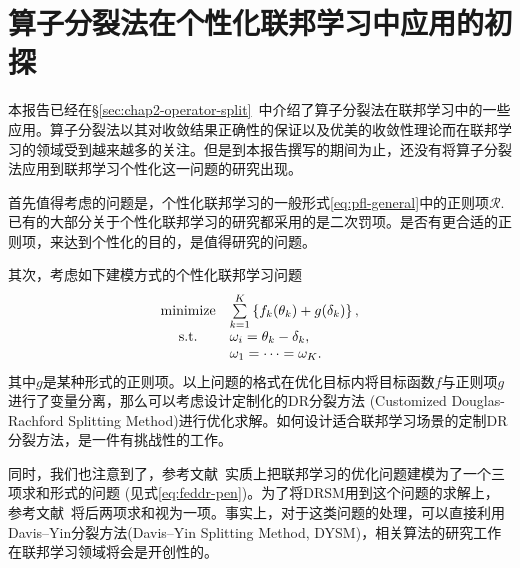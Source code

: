 \section{算子分裂法在个性化联邦学习中应用的初探}
\label{sec:chap3-pfl-os}



本报告已经在\S\ref{sec:chap2-operator-split}~中介绍了算子分裂法在联邦学习中的一些应用。算子分裂法以其对收敛结果正确性的保证\cite{pathak2020fedsplit}以及优美的收敛性理论\cite{ryu2022large}而在联邦学习的领域受到越来越多的关注。但是到本报告撰写的期间为止，还没有将算子分裂法应用到联邦学习个性化这一问题的研究出现。

首先值得考虑的问题是，个性化联邦学习的一般形式\eqref{eq:pfl-general}中的正则项$\mathcal{R}.$ 已有的大部分关于个性化联邦学习的研究\cite{hanzely2020federated, li_2021_ditto, t2020pfedme}都采用的是二次罚项。是否有更合适的正则项，来达到个性化的目的，是值得研究的问题。

其次，考虑如下建模方式的个性化联邦学习问题
\begin{equation}
\label{eq:customized-drsm}
\begin{array}{cl}
 \operatorname*{minimize} & \sum\limits_{k=1}^K \left\{ f_k(\theta_k) + g(\delta_k) \right\}, \\
 \text{s.t.} & \omega_i = \theta_k - \delta_k, \\
 & \omega_1 = \cdots = \omega_K.
\end{array}
\end{equation}
其中$g$是某种形式的正则项。以上问题的格式在优化目标内将目标函数$f$与正则项$g$进行了变量分离，那么可以考虑设计定制化的DR分裂方法 (Customized Douglas-Rachford Splitting Method)\cite{Han_2013_CDRSM}进行优化求解。如何设计适合联邦学习场景的定制DR分裂方法，是一件有挑战性的工作。

同时，我们也注意到了，参考文献\parencite{tran2021feddr}~实质上把联邦学习的优化问题建模为了一个三项求和形式的问题 (见式\eqref{eq:feddr-pen})。为了将DRSM用到这个问题的求解上，参考文献\parencite{tran2021feddr}~将后两项求和视为一项。事实上，对于这类问题的处理，可以直接利用Davis–Yin分裂方法(Davis–Yin Splitting Method, DYSM)\cite{ryu2022large, Davis_2017_DYS}，相关算法的研究工作在联邦学习领域将会是开创性的。
